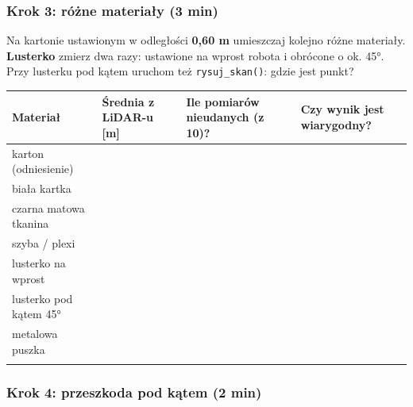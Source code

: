 \subsubsection{Krok 3: różne materiały (3 min)}\label{krok-3-ruxf3ux17cne-materiaux142y-3-min}

Na kartonie ustawionym w odległości \textbf{0,60 m} umieszczaj kolejno różne materiały. \textbf{Lusterko} zmierz dwa razy: ustawione na wprost robota i obrócone o ok. 45°. Przy lusterku pod kątem uruchom też \texttt{rysuj\_skan()}: gdzie jest punkt?

\par\noindent\begin{minipage}{\linewidth}
\begin{tabular}{@{}
  >{\raggedright\arraybackslash}p{}
  >{\raggedright\arraybackslash}p{}
  >{\raggedright\arraybackslash}p{}
  >{\raggedright\arraybackslash}p{}@{}}
\toprule\noalign{}
\begin{minipage}[b]{\linewidth}\raggedright
Materiał
\end{minipage} & \begin{minipage}[b]{\linewidth}\raggedright
Średnia z LiDAR-u {[}m{]}
\end{minipage} & \begin{minipage}[b]{\linewidth}\raggedright
Ile pomiarów nieudanych (z 10)?
\end{minipage} & \begin{minipage}[b]{\linewidth}\raggedright
Czy wynik jest wiarygodny?
\end{minipage} \\
\midrule\noalign{}
karton (odniesienie) & & & \\
biała kartka & & & \\
czarna matowa tkanina & & & \\
szyba / plexi & & & \\
lusterko na wprost & & & \\
lusterko pod kątem 45° & & & \\
metalowa puszka & & & \\
\bottomrule\noalign{}
\end{tabular}
\end{minipage}\par\medskip

\subsubsection{Krok 4: przeszkoda pod kątem (2 min)}\label{krok-4-przeszkoda-pod-kux105tem-2-min}

